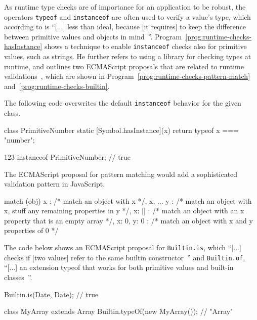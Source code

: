 As runtime type checks are of importance for an application to be robust, the operators \texttt{typeof} and \texttt{instanceof} are often used to verify a value's type, which according to \citeauthor{DynamicTypeChecks:Rauschmayer:2017} is ``[...] less than ideal, because [it requires] to keep the difference between primitive values and objects in mind~\cite{DynamicTypeChecks:Rauschmayer:2017}''. Program~\ref{prog:runtime-checks-hasInstance} shows a technique to enable \texttt{instanceof} checks also for primitive values, such as strings. He further refers to using a library for checking types at runtime, and outlines two ECMAScript proposals that are related to runtime validations~\cite{DynamicTypeChecks:Rauschmayer:2017}, which are shown in Program~\ref{prog:runtime-checks-pattern-match} and~\ref{prog:runtime-checks-builtin}.

\begin{program}
\caption{The following code overwrites the default \texttt{instanceof} behavior for the given class.~\cites{DynamicTypeChecks:Rauschmayer:2017, DynamicTypeChecks:hasInstance}}
\label{prog:runtime-checks-hasInstance}
\begin{JsCode}
class PrimitiveNumber {
  static [Symbol.hasInstance](x) {
    return typeof x === "number";
  }
}

123 instanceof PrimitiveNumber; // true
\end{JsCode}
\end{program}

\begin{program}
\caption{The ECMAScript proposal for pattern matching would add a sophisticated validation pattern in JavaScript.~\cites{DynamicTypeChecks:Rauschmayer:2017, PatternMatchingProposalRepo}}
\label{prog:runtime-checks-pattern-match}
\begin{JsCode}
match (obj) {
  { x }: /* match an object with x */,
  { x, ... y }: /* match an object with x, stuff any remaining properties in y */,
  { x: [] }: /* match an object with an x property that is an empty array */,
  { x: 0, y: 0 }: /* match an object with x and y properties of 0 */
}
\end{JsCode}
\end{program}

\begin{program}
\caption{The code below shows an ECMAScript proposal for \texttt{Builtin.is}, which ``[...] checks if [two values] refer to the same builtin constructor~\cite{DynamicTypeChecks:Rauschmayer:2017}'' and \texttt{Builtin.of}, ``[...] an extension typeof that works for both primitive values and built-in classes~\cite{DynamicTypeChecks:Rauschmayer:2017}''.~\cites{DynamicTypeChecks:Rauschmayer:2017, BuiltinProposalRepo}}
\label{prog:runtime-checks-builtin}
\begin{JsCode}
Builtin.is(Date, Date); // true

class MyArray extends Array { }
Builtin.typeOf(new MyArray()); // "Array"
\end{JsCode}
\end{program}

